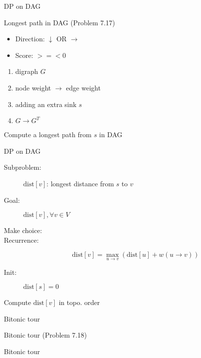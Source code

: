 \begin{frame}{DP on DAG}
  \begin{exampleblock}{Longest path in DAG (Problem 7.17)}
	\begin{itemize}
	  \item Direction: $\downarrow$ OR $\rightarrow$
	  \item Score: $>=< 0$
	\end{itemize}
  \end{exampleblock}

  \pause
  \begin{enumerate}
	\item digraph $G$
	\item node weight $\to$ edge weight
	\item adding an extra sink $s$
	\item $G \to G^{T}$
  \end{enumerate}

  \pause
  \centerline{Compute a longest path from $s$ in DAG}
\end{frame}
\begin{frame}{DP on DAG}
  \begin{description}
	\item[Subproblem:] $\text{dist}[v]$: longest distance from $s$ to $v$ 
	\item[Goal:] $\text{dist}[v], \forall v \in V$
	  \pause
	\item[Make choice:] 
	\item[Recurrence:] 
	  \[
		\text{dist}[v] = \max_{u \to v} \left(\text{dist}[u] + w(u \to v)\right) 
	  \]
	  \pause
	\item[Init:] $\text{dist}[s] = 0$
  \end{description}

  \pause
  \vspace{0.60cm}
  \centerline{Compute $\text{dist}[v]$ in topo. order}
\end{frame}
\begin{frame}{Bitonic tour}
  \begin{exampleblock}{Bitonic tour (Problem 7.18)}
  \end{exampleblock}
\end{frame}
\begin{frame}{Bitonic tour}
\end{frame}
